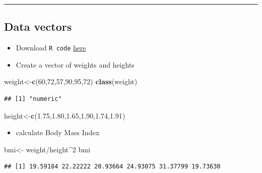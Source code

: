 \documentclass[]{article}
\def\tightlist{}
\newenvironment{Shaded}{\begin{snugshade}}{\end{snugshade}}
\newcommand{\KeywordTok}[1]{\textcolor[rgb]{0.13,0.29,0.53}{\textbf{{#1}}}}
\newcommand{\DecValTok}[1]{\textcolor[rgb]{0.00,0.00,0.81}{{#1}}}
\newcommand{\FloatTok}[1]{\textcolor[rgb]{0.00,0.00,0.81}{{#1}}}
\newcommand{\StringTok}[1]{\textcolor[rgb]{0.31,0.60,0.02}{{#1}}}
\newcommand{\NormalTok}[1]{{#1}}
\numberwithin{equation}{section}
\begin{document}
\begin{center}\rule{0.5\linewidth}{\linethickness}\end{center}

\subsection{Data vectors}\label{data-vectors}

\begin{itemize}
\item
  Download \texttt{R\ code}
  \href{http://idaejin.github.io/bcam-courses/rbasics/rbasics.R}{here}
\item
  Create a vector of weights and heights
\end{itemize}

\begin{Shaded}
\begin{Highlighting}[]
\NormalTok{weight<-}\KeywordTok{c}\NormalTok{(}\DecValTok{60}\NormalTok{,}\DecValTok{72}\NormalTok{,}\DecValTok{57}\NormalTok{,}\DecValTok{90}\NormalTok{,}\DecValTok{95}\NormalTok{,}\DecValTok{72}\NormalTok{)  }
\KeywordTok{class}\NormalTok{(weight)}
\end{Highlighting}
\end{Shaded}

\begin{verbatim}
## [1] "numeric"
\end{verbatim}

\begin{Shaded}
\begin{Highlighting}[]
\NormalTok{height<-}\KeywordTok{c}\NormalTok{(}\FloatTok{1.75}\NormalTok{,}\FloatTok{1.80}\NormalTok{,}\FloatTok{1.65}\NormalTok{,}\FloatTok{1.90}\NormalTok{,}\FloatTok{1.74}\NormalTok{,}\FloatTok{1.91}\NormalTok{)}
\end{Highlighting}
\end{Shaded}

\begin{itemize}
\tightlist
\item
  calculate Body Mass Index
\end{itemize}

\begin{Shaded}
\begin{Highlighting}[]
\NormalTok{bmi<-}\StringTok{ }\NormalTok{weight/height^}\DecValTok{2}
\NormalTok{bmi}
\end{Highlighting}
\end{Shaded}

\begin{verbatim}
## [1] 19.59184 22.22222 20.93664 24.93075 31.37799 19.73630
\end{verbatim}
\end{document}
